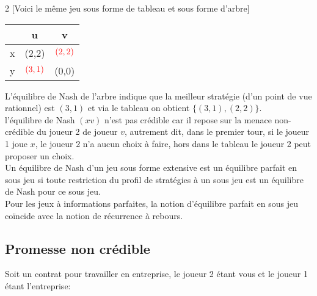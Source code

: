 \begin{multicols}{2}
[Voici le même jeu sous forme de tableau et sous forme d'arbre]

\begin{tabular}{c|cc}
$ $ & u & v\\
\hline
x & (2,2) & $\textcolor{red}{(2,2)}$\\
y & $\textcolor{red}{(3,1)}$ & (0,0)\\
\end{tabular}
\end{multicols}

L'équilibre de Nash de l'arbre indique que la meilleur stratégie (d'un point de vue rationnel) est $(3,1)$ et via le tableau on obtient $\{(3,1),(2,2)\}$.\\
l'équilibre de Nash $(xv)$ n'est pas crédible car il repose sur la menace non-crédible du joueur 2 de joueur $v$, autrement dit, dans le premier tour, si le joueur 1 joue $x$, le joueur 2 n'a aucun choix à faire, hors dans le tableau le joueur 2 peut proposer un choix.\\

Un équilibre de Nash d'un jeu sous forme extensive est un équilibre parfait en sous jeu si toute restriction du profil de stratégies à un sous jeu est un équilibre de Nash pour ce sous jeu.\\
Pour les jeux à informations parfaites, la notion d'équilibre parfait en sous jeu coïncide avec la notion de récurrence à rebours.\\ 

\pagebreak
\subsection{Promesse non crédible}
Soit un contrat pour travailler en entreprise, le joueur 2 étant vous et le joueur 1 étant l'entreprise:

